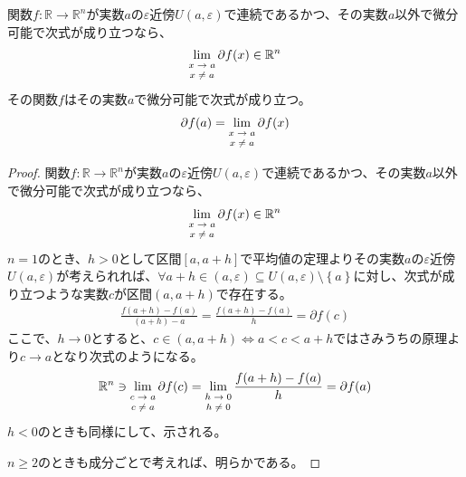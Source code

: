 \documentclass[dvipdfmx]{jsarticle}
\begin{document}
\begin{thm}\label{4.2.2.9}
関数$f:\mathbb{R} \rightarrow \mathbb{R}^{n}$が実数$a$の$\varepsilon$近傍$U(a,\varepsilon)$で連続であるかつ、その実数$a$以外で微分可能で次式が成り立つなら、
\begin{align*}
\lim_{\scriptsize \begin{matrix}
x \rightarrow a \\
x \neq a \\
\end{matrix}}{\partial f(x)} \in \mathbb{R}^{n}
\end{align*}
その関数$f$はその実数$a$で微分可能で次式が成り立つ。
\begin{align*}
\partial f(a) = \lim_{\scriptsize \begin{matrix}
x \rightarrow a \\
x \neq a \\
\end{matrix}}{\partial f(x)}
\end{align*}
\end{thm}
\begin{proof}
関数$f:\mathbb{R} \rightarrow \mathbb{R}^{n}$が実数$a$の$\varepsilon$近傍$U(a,\varepsilon)$で連続であるかつ、その実数$a$以外で微分可能で次式が成り立つなら、
\begin{align*}
\lim_{\scriptsize \begin{matrix}
x \rightarrow a \\
x \neq a \\
\end{matrix}}{\partial f(x)} \in \mathbb{R}^{n}
\end{align*}
$n = 1$のとき、$h > 0$として区間$[ a,a + h]$で平均値の定理よりその実数$a$の$\varepsilon$近傍$U(a,\varepsilon)$が考えられれば、$\forall a + h \in (a,\varepsilon) \subseteq U(a,\varepsilon) \setminus \left\{ a \right\}$に対し、次式が成り立つような実数$c$が区間$(a,a + h)$で存在する。
\begin{align*}
\frac{f(a + h) - f(a)}{(a + h) - a} = \frac{f(a + h) - f(a)}{h} = \partial f(c)
\end{align*}
ここで、$h \rightarrow 0$とすると、$c \in (a,a + h) \Leftrightarrow a < c < a + h$ではさみうちの原理より$c \rightarrow a$となり次式のようになる。
\begin{align*}
\mathbb{R}^{n} \ni \lim_{\scriptsize \begin{matrix}
c \rightarrow a \\
c \neq a \\
\end{matrix}}{\partial f(c)} = \lim_{\scriptsize \begin{matrix}
h \rightarrow 0 \\
h \neq 0 \\
\end{matrix}}\frac{f(a + h) - f(a)}{h} = \partial f(a)
\end{align*}
$h < 0$のときも同様にして、示される。\par
$n \geq 2$のときも成分ごとで考えれば、明らかである。
\end{proof}
\end{document}
